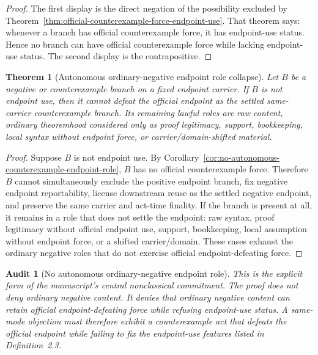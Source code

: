 \documentclass[11pt]{article}
\newtheorem{theorem}{Theorem}[section]
\newtheorem{audit}{Audit}[section]
\begin{document}
\begin{proof}
The first display is the direct negation of the possibility excluded by Theorem~\ref{thm:official-counterexample-force-endpoint-use}.  That theorem says: whenever a branch has official counterexample force, it has endpoint-use status.  Hence no branch can have official counterexample force while lacking endpoint-use status.  The second display is the contrapositive.
\end{proof}

\begin{theorem}[Autonomous ordinary-negative endpoint role collapse]\label{thm:autonomous-negative-role-collapse}
Let \(B\) be a negative or counterexample branch on a fixed endpoint carrier.  If \(B\) is not endpoint use, then it cannot defeat the official endpoint as the settled same-carrier counterexample branch.  Its remaining lawful roles are raw content, ordinary theoremhood considered only as proof legitimacy, support, bookkeeping, local syntax without endpoint force, or carrier/domain-shifted material.
\end{theorem}

\begin{proof}
Suppose \(B\) is not endpoint use.  By Corollary~\ref{cor:no-autonomous-counterexample-endpoint-role}, \(B\) has no official counterexample force.  Therefore \(B\) cannot simultaneously exclude the positive endpoint branch, fix negative endpoint reportability, license downstream reuse as the settled negative endpoint, and preserve the same carrier and act-time finality.  If the branch is present at all, it remains in a role that does not settle the endpoint: raw syntax, proof legitimacy without official endpoint use, support, bookkeeping, local assumption without endpoint force, or a shifted carrier/domain.  These cases exhaust the ordinary negative roles that do not exercise official endpoint-defeating force.
\end{proof}

\begin{audit}[No autonomous ordinary-negative endpoint role]
This is the explicit form of the manuscript's central nonclassical commitment.  The proof does not deny ordinary negative content.  It denies that ordinary negative content can retain official endpoint-defeating force while refusing endpoint-use status.  A same-mode objection must therefore exhibit a counterexample act that defeats the official endpoint while failing to fix the endpoint-use features listed in Definition~2.3.
\end{audit}
\end{document}
